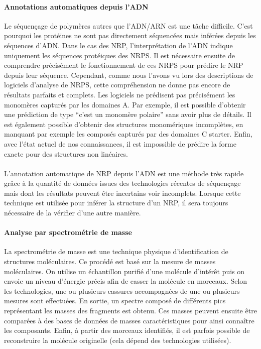 \documentclass[12pt,french,twoside]{report}
\begin{document}
\paragraph{Annotations automatiques depuis l'ADN}
Le séquençage de polymères autres que l'ADN/ARN est une tâche difficile.
C'est pourquoi les protéines ne sont pas directement séquencées mais inférées depuis les séquences d'ADN.
Dans le cas des NRP, l'interprétation de l'ADN indique uniquement les séquences protéiques des NRPS.
Il est nécessaire ensuite de comprendre précisément le fonctionnement de ces NRPS pour prédire le NRP depuis leur séquence.
Cependant, comme nous l'avons vu lors des descriptions de logiciels d'analyse de NRPS, cette compréhension ne donne pas encore de résultats parfaits et complets.
Les logiciels ne prédisent pas précisément les monomères capturés par les domaines A.
Par exemple, il est possible d'obtenir une prédiction de type ``c'est un monomère polaire'' sans avoir plus de détails.
Il est également possible d'obtenir des structures monomériques incomplètes, en manquant par exemple les composés capturés par des domaines C starter.
Enfin, avec l'état actuel de nos connaissances, il est impossible de prédire la forme exacte pour des structures non linéaires.

\paragraph{}L'annotation automatique de NRP depuis l'ADN est une méthode très rapide grâce à la quantité de données issues des technologies récentes de séquençage mais dont les résultats peuvent être incertains voir incomplets.
Lorsque cette technique est utilisée pour inférer la structure d'un NRP, il sera toujours nécessaire de la vérifier d'une autre manière.


\paragraph{Analyse par spectrométrie de masse}
La spectrométrie de masse est une technique physique d'identification de structures moléculaires.
Ce procédé est basé sur la mesure de masses moléculaires.
On utilise un échantillon purifié d'une molécule d'intérêt puis on envoie un niveau d'énergie précis afin de casser la molécule en morceaux.
Selon les technologies, une ou plusieurs cassures accompagnées de une ou plusieurs mesures sont effectuées.
En sortie, un spectre composé de différents pics représentant les masses des fragments est obtenu.
Ces masses peuvent ensuite être comparées à des bases de données de masses caractéristiques pour ainsi connaître les composants.
Enfin, à partir des morceaux identifiés, il est parfois possible de reconstruire la molécule originelle (cela dépend des technologies utilisées).
\end{document}
